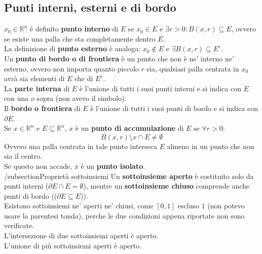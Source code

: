 \documentclass[12pt,a4paper]{article}
\begin{document}
\subsection{Punti interni, esterni e di bordo}
$x_0 \in \mathbb{R}^n$ è definito \textbf{punto interno} di $E$ se $x_0 \in E$ e $\exists r > 0 : B(x,r) \subseteq E$, ovvero se esiste una palla che sta completamente dentro $E$.\\
La definizione di \textbf{punto esterno} è analoga: $x_0 \notin E$ e $\exists B(x,r) \subseteq E^c$.\\
Un \textbf{punto di bordo o di frontiera} è un punto che non è ne' interno ne' esterno, ovvero non importa quanto piccolo $r$ sia, qualsiasi palla centrata in $x_0$ avrà sia elementi di $E$ che di $E^c$.\\
La \textbf{parte interna} di $E$ è l'unione di tutti i suoi punti interni e si indica con $E$ con una $o$ sopra (non avevo il simbolo).\\
Il \textbf{bordo o frontiera} di $E$ è l'unione di tutti i suoi punti di bordo e si indica con $\partial E$.\\
Se $x \in \mathbb{R}^n$ e $E \subseteq \mathbb{R}^n$, $x$ è un \textbf{punto di accumulazione} di $E$ se $\forall r > 0$:
\[
B(x,r) \setminus {x} \cap E \ne \emptyset
\]
Ovvero una palla centrata in tale punto interseca $E$ almeno in un punto che non sia il centro.\\
Se questo non accade, $x$ è un \textbf{punto isolato}.\\
/subsection{Proprietà sottoinsiemi}
Un \textbf{sottoinsieme aperto} è costituito solo da punti interni ($\partial E \cap E = \emptyset$), mentre un \textbf{sottoinsieme chiuso} comprende anche punti di bordo (($\partial E \subseteq E$)).\\
Esistono sottoinsiemi ne' aperti ne' chiusi, come $[0,1]$ escluso $1$ (non potevo usare la parentesi tonda), perche le due condizioni appena riportate non sono verificate.\\
L'intersezione di due sottoinsiemi aperti è aperto.\\
L'unione di più sottoinsiemi aperti è aperto.
\end{document}
